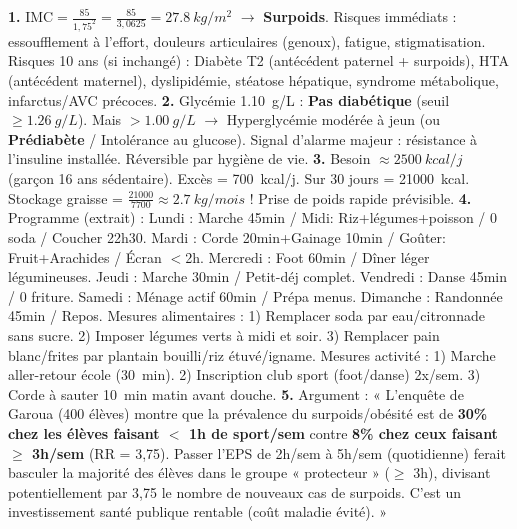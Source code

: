 \documentclass[11pt]{article}
\newcommand{\cle}[1]{{\popxbold\color{popdark}#1}}
\begin{document}
\begin{corrige}
\textbf{1.} $\mathrm{IMC} = \frac{85}{1,75^2} = \frac{85}{3,0625} = \SI{27,8}{kg/m^2}$ $\rightarrow$ \textbf{Surpoids}. Risques immédiats : essoufflement à l'effort, douleurs articulaires (genoux), fatigue, stigmatisation. Risques 10 ans (si inchangé) : Diabète T2 (antécédent paternel + surpoids), HTA (antécédent maternel), dyslipidémie, stéatose hépatique, syndrome métabolique, infarctus/AVC précoces.
\textbf{2.} Glycémie \SI{1,10}{g/L} : \textbf{Pas diabétique} (seuil $\ge \SI{1,26}{g/L}$). Mais $> \SI{1,00}{g/L}$ $\rightarrow$ \cle{Hyperglycémie modérée à jeun} (ou \textbf{Prédiabète} / Intolérance au glucose). Signal d'alarme majeur : résistance à l'insuline installée. Réversible par hygiène de vie.
\textbf{3.} Besoin $\approx \SI{2500}{kcal/j}$ (garçon 16 ans sédentaire). Excès = \SI{700}{kcal/j}. Sur 30 jours = \SI{21000}{kcal}. Stockage graisse = $\frac{21000}{7700} \approx \SI{2,7}{kg/mois}$ ! Prise de poids rapide prévisible.
\textbf{4.} Programme (extrait) : Lundi : Marche 45min / Midi: Riz+légumes+poisson / 0 soda / Coucher 22h30. Mardi : Corde 20min+Gainage 10min / Goûter: Fruit+Arachides / Écran $<$2h. Mercredi : Foot 60min / Dîner léger légumineuses. Jeudi : Marche 30min / Petit-déj complet. Vendredi : Danse 45min / 0 friture. Samedi : Ménage actif 60min / Prépa menus. Dimanche : Randonnée 45min / Repos.
Mesures alimentaires : 1) Remplacer soda par eau/citronnade sans sucre. 2) Imposer légumes verts à midi et soir. 3) Remplacer pain blanc/frites par plantain bouilli/riz étuvé/igname.
Mesures activité : 1) Marche aller-retour école (\SI{30}{min}). 2) Inscription club sport (foot/danse) 2x/sem. 3) Corde à sauter \SI{10}{min} matin avant douche.
\textbf{5.} Argument : « L'enquête de Garoua (400 élèves) montre que la prévalence du surpoids/obésité est de \textbf{30\% chez les élèves faisant $<$ 1h de sport/sem} contre \textbf{8\% chez ceux faisant $\ge$ 3h/sem} (RR = 3,75). Passer l'EPS de 2h/sem à 5h/sem (quotidienne) ferait basculer la majorité des élèves dans le groupe « protecteur » ($\ge$ 3h), divisant potentiellement par 3,75 le nombre de nouveaux cas de surpoids. C'est un investissement santé publique rentable (coût maladie évité). »
\end{corrige}
\end{document}
